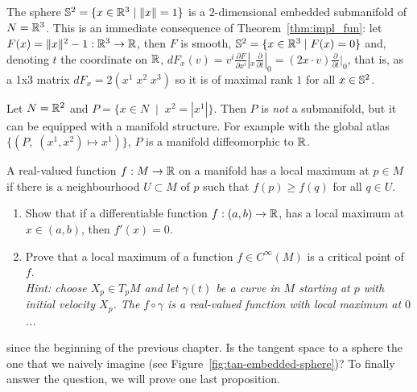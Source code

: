 \begin{example}\label{ex:s2}
	The sphere $\mathbb{S}^2 = \{x\in\mathbb{R}^3 \mid \|x\| = 1\}$ is a $2$-dimensional embedded submanifold of $N=\mathbb{R}^3$.
	This is an immediate consequence of Theorem~\ref{thm:impl_fun}: let $F(x) = \|x\|^2 -1 : \mathbb{R}^3 \to \mathbb{R}$, then $F$ is smooth, $\mathbb{S}^2 = \{x\in\mathbb{R}^3\mid F(x)=0\}$ and, denoting $t$ the coordinate on $\mathbb{R}$, $dF_x(v)= v^i \frac{\partial F}{\partial x^i}|_x \frac{\partial}{\partial t}|_0 = (2x\cdot v) \frac{\partial}{\partial t}|_0$, that is, as a 1x3 matrix $dF_x = 2(x^1\; x^2\; x^3)$ so it is of maximal rank $1$ for all $x\in\mathbb{S}^2$.
\end{example}

\begin{example}
	Let $N = \mathbb{R}^2$ and $P = \{ x\in N \;\mid\; x^2 = |x^1| \}$.
	Then $P$ is \emph{not} a submanifold, but it can be equipped with a manifold structure.
	For example with the global atlas $\{(P,\; (x^1,x^2)\mapsto x^1)\}$, $P$ is a manifold diffeomorphic to $\mathbb{R}$.
\end{example}

\begin{exercise}
	A real-valued function $f:M\to\mathbb{R}$ on a manifold has a local maximum at $p\in M$ if there is a neighbourhood $U\subset M$ of $p$ such that $f(p) \geq f(q)$ for all $q\in U$.
	\begin{enumerate}
		\item Show that if a differentiable function $f:(a,b)\to\mathbb{R}$, has a local maximum at $x\in (a,b)$, then $f'(x) = 0$.
		\item Prove that a local maximum of a function $f\in C^\infty(M)$ is a critical point of $f$.\\
		      \textit{\small Hint: choose $X_p\in T_pM$ and let $\gamma(t)$ be a curve in $M$ starting at $p$ with initial velocity $X_p$. The $f\circ \gamma$ is a real-valued function with local maximum at $0$...}
	\end{enumerate}
\end{exercise}

 since the beginning of the previous chapter.
Is the tangent space to a sphere the one that we naively imagine (see Figure~\ref{fig:tan-embedded-sphere})?
To finally answer the question, we will prove one last proposition.

